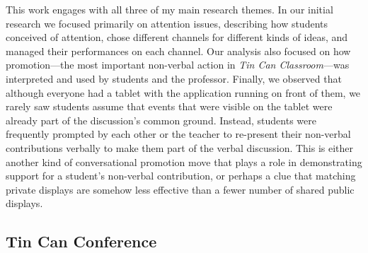 \documentclass{tufte-handout}
\begin{document}
This work engages with all three of my main research themes. In our initial research we focused primarily on attention issues, describing how students conceived of attention, chose different channels for different kinds of ideas, and managed their performances on each channel. Our analysis also focused on how promotion---the most important non-verbal action in \emph{Tin Can Classroom}---was interpreted and used by students and the professor. Finally, we observed that although everyone had a tablet with the application running on front of them, we rarely saw students assume that events that were visible on the tablet were already part of the discussion's common ground. Instead, students were frequently prompted by each other or the teacher to re-present their non-verbal contributions verbally to make them part of the verbal discussion. This is either another kind of conversational promotion move that plays a role in demonstrating support for a student's non-verbal contribution, or perhaps a clue that matching private displays are somehow less effective than a fewer number of shared public displays.

% 


\subsection{Tin Can Conference}
\end{document}
